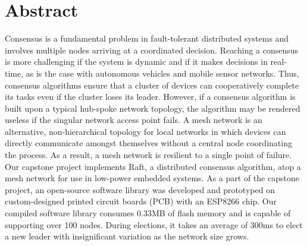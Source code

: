 \section{Abstract}
\newcommand{\nextInternalParagraphStartsHere}{}

Consensus is a fundamental problem in fault-tolerant distributed systems and involves multiple nodes arriving at a coordinated decision. Reaching a consensus is more challenging if the system is dynamic and if it makes decisions in real-time, as is the case with autonomous vehicles and mobile sensor networks. Thus, consensus algorithms ensure that a cluster of devices can cooperatively complete its tasks even if the cluster loses its leader. However, if a consensus algorithm is built upon a typical hub-spoke network topology, the algorithm may be rendered useless if the singular network access point fails. \nextInternalParagraphStartsHere A mesh network is an alternative, non-hierarchical topology for local networks in which devices can directly communicate amongst themselves without a central node coordinating the process. As a result, a mesh network is resilient to a single point of failure. \nextInternalParagraphStartsHere Our capstone project implements Raft, a distributed consensus algorithm, atop a mesh network for use in low-power embedded systems. As a part of the capstone project, an open-source software library was developed and prototyped on custom-designed printed circuit boards (PCB) with an ESP8266 chip. Our compiled software library consumes 0.33MB of flash memory and is capable of supporting over 100 nodes. During elections, it takes an average of 300ms to elect a new leader with insignificant variation as the network size grows.
